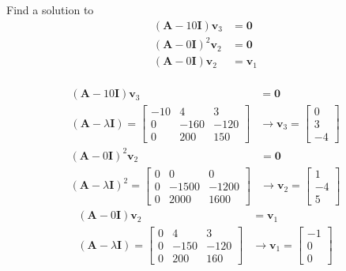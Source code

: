 \begin{itemize}
Find a solution to
\begin{align*}
(\mathbf{A}- 10\mathbf{I}) \mathbf{v}_3& = \mathbf{0} \\
(\mathbf{A}-0 \mathbf{I})^2 \mathbf{v}_2 & = \mathbf{0} \\
(\mathbf{A}- 0\mathbf{I}) \mathbf{v}_2& = \mathbf{v}_1 \\
\end{align*}

\begin{align*}
 (\mathbf{A}- 10\mathbf{I}) \mathbf{v}_3& = \mathbf{0} \\
 (\mathbf{A}-\lambda \mathbf{I}) = \begin{bmatrix}
                                    -10& 4 & 3\\
                                    0 &  -160 & -120\\
                                    0 & 200 & 150
 \end{bmatrix}
&\rightarrow \mathbf{v}_3= \begin{bmatrix}
                            0\\3\\-4
                           \end{bmatrix}
\end{align*}
\begin{align*}
 (\mathbf{A}-0 \mathbf{I})^2 \mathbf{v}_2 & = \mathbf{0} \\
 (\mathbf{A}-\lambda \mathbf{I})^2 = \begin{bmatrix}
                                        0 & 0 & 0\\
                                      0 & -1500 &-1200\\
                                      0 & 2000 & 1600
 \end{bmatrix}
&\rightarrow \mathbf{v}_2= \begin{bmatrix}
                            1\\-4\\5
                           \end{bmatrix}
\end{align*}
\begin{align*}
 (\mathbf{A}- 0\mathbf{I}) \mathbf{v}_2& = \mathbf{v}_1 \\
 (\mathbf{A}-\lambda \mathbf{I}) = \begin{bmatrix}
                                    0 & 4 & 3\\
                                    0 &  -150 & -120\\
                                    0 & 200 & 160
 \end{bmatrix}
&\rightarrow \mathbf{v}_1= \begin{bmatrix}
                            -1\\0\\0
                           \end{bmatrix}
\end{align*}


\end{itemize}
